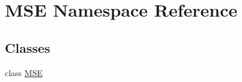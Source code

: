 \hypertarget{namespace_m_s_e}{}\section{M\+SE Namespace Reference}
\label{namespace_m_s_e}
\subsection*{Classes}
\begin{DoxyCompactItemize}
\item 
class \mbox{\hyperlink{class_m_s_e_1_1_m_s_e}{M\+SE}}
\end{DoxyCompactItemize}

